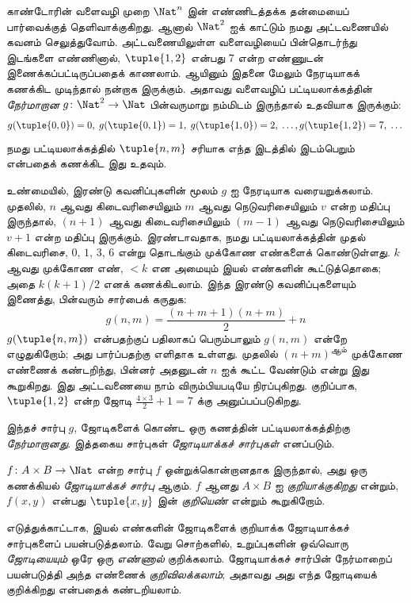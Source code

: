 \documentclass[../../../include/open-logic-section]{subfiles}
\begin{document}

\begin{explain}
காண்டோரின் வளைவழி முறை $\Nat^n$ இன் எண்ணிடத்தக்க தன்மையைப்
பார்வைக்குத் தெளிவாக்குகிறது.
ஆனால் $\Nat^2$ ஐக் காட்டும் நமது அட்டவணையில் கவனம் செலுத்துவோம்.
அட்டவணையிலுள்ள வளைவழியைப் பின்தொடர்ந்து இடங்களை எண்ணினால்,
$\tuple{1,2}$ என்பது $7$ என்ற எண்ணுடன் இணைக்கப்பட்டிருப்பதைக் காணலாம்.
ஆயினும் இதனை மேலும் நேரடியாகக் கணக்கிட முடிந்தால் நன்றாக இருக்கும்.
அதாவது வளைவழிப் பட்டியலாக்கத்தின் \emph{நேர்மாறான}
$g\colon \Nat^2 \to \Nat$ பின்வருமாறு நம்மிடம் இருந்தால் உதவியாக இருக்கும்:
\[
g(\tuple{0,0}) = 0, \;
g(\tuple{0,1}) = 1, \;
g(\tuple{1,0}) = 2, \; \dots,
g(\tuple{1,2}) = 7, \; \dots
\]
நமது பட்டியலாக்கத்தில் $\tuple{n, m}$ சரியாக எந்த இடத்தில்
இடம்பெறும் என்பதைக் கணக்கிட இது உதவும்.

உண்மையில், இரண்டு கவனிப்புகளின் மூலம் $g$ ஐ நேரடியாக வரையறுக்கலாம்.
முதலில், $n$ ஆவது கிடைவரிசையிலும் $m$ ஆவது நெடுவரிசையிலும்
$v$ என்ற மதிப்பு இருந்தால், $(n+1)$ ஆவது கிடைவரிசையிலும்
$(m-1)$ ஆவது நெடுவரிசையிலும் $v + 1$ என்ற மதிப்பு இருக்கும்.
இரண்டாவதாக, நமது பட்டியலாக்கத்தின் முதல் கிடைவரிசை,
$0$, $1$, $3$, $6$ என்று தொடங்கும் முக்கோண எண்களைக் கொண்டுள்ளது.
$k$ ஆவது முக்கோண எண், $< k$ என அமையும் இயல் எண்களின் கூட்டுத்தொகை;
அதை $k(k+1)/2$ எனக் கணக்கிடலாம்.
இந்த இரண்டு கவனிப்புகளையும் இணைத்து, பின்வரும் சார்பைக் கருதுக:
\[
  g(n,m) = \frac{(n+m+1)(n+m)}{2} + n
\]
$g(\tuple{n, m})$ என்பதற்குப் பதிலாகப் பெரும்பாலும்
$g(n, m)$ என்றே எழுதுகிறோம்; அது பார்ப்பதற்கு எளிதாக உள்ளது.
முதலில் $(n+m)^\text{ஆம்}$ முக்கோண எண்ணைக் கண்டறிந்து,
பின்னர் அதனுடன் $n$ ஐக் கூட்ட வேண்டும் என்று இது கூறுகிறது.
இது அட்டவணையை நாம் விரும்பியபடியே நிரப்புகிறது.
குறிப்பாக, $\tuple{1, 2}$ என்ற ஜோடி
$\frac{4 \times 3}{2} +
1 = 7$ க்கு அனுப்பப்படுகிறது.

இந்தச் சார்பு $g$, ஜோடிகளைக் கொண்ட ஒரு கணத்தின்
பட்டியலாக்கத்திற்கு \emph{நேர்மாறானது}.
இத்தகைய சார்புகள் \emph{ஜோடியாக்கச் சார்புகள்} எனப்படும்.
\end{explain}

\begin{defn}[ஜோடியாக்கச் சார்பு]
$f\colon A \times B \to \Nat$ என்ற சார்பு $f$ ஒன்றுக்கொன்றானதாக இருந்தால்,
அது ஒரு கணக்கியல் \emph{ஜோடியாக்கச் சார்பு} ஆகும்.
$f$ ஆனது $A \times B$ ஐ \emph{குறியாக்குகிறது} என்றும்,
$f(x,y)$ என்பது $\tuple{x,y}$ இன் \emph{குறியெண்} என்றும் கூறுகிறோம்.
\end{defn}

\begin{explain}
எடுத்துக்காட்டாக, இயல் எண்களின் ஜோடிகளைக் குறியாக்க
ஜோடியாக்கச் சார்புகளைப் பயன்படுத்தலாம்.
வேறு சொற்களில், உறுப்புகளின் ஒவ்வொரு \emph{ஜோடியையும்}
ஒரே ஒரு \emph{எண்ணால்} குறிக்கலாம்.
ஜோடியாக்கச் சார்பின் நேர்மாறைப் பயன்படுத்தி அந்த எண்ணைக்
\emph{குறிவிலக்கலாம்}; அதாவது அது எந்த ஜோடியைக் குறிக்கிறது
என்பதைக் கண்டறியலாம்.
\end{explain}
\end{document}
